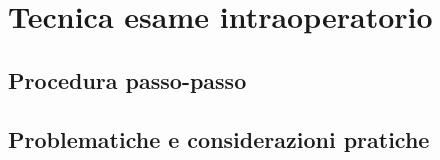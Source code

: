 \chapter{Tecnica esame intraoperatorio}

\section{Procedura passo-passo}

\section{Problematiche e considerazioni pratiche}
